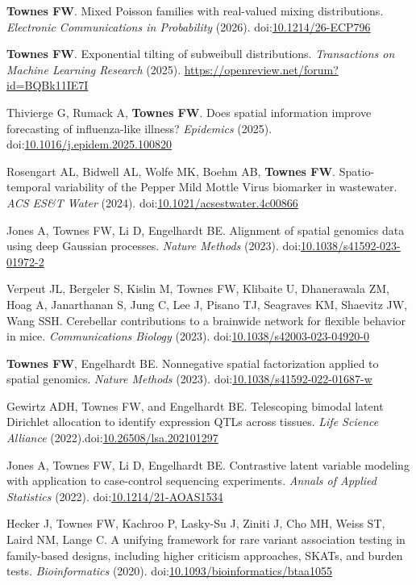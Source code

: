 \documentclass[10pt]{article}
\newcommand\doilink[1]{\href{https://dx.doi.org/#1}{#1}}
\newcommand\doi[1]{doi:\doilink{#1}}
\begin{document}
\begin{enumerate}[label= {[\arabic*]}]
\item {\bf Townes FW}. Mixed Poisson families with real-valued mixing distributions.\\ {\it Electronic Communications in Probability} (2026). \doi{10.1214/26-ECP796}
\item {\bf Townes FW}. Exponential tilting of subweibull distributions. {\it Transactions on Machine Learning Research} (2025). \url{https://openreview.net/forum?id=BQBk11IE7I}
\item Thivierge G, Rumack A, {\bf Townes FW}. Does spatial information improve forecasting of influenza-like illness? {\it Epidemics} (2025). \doi{10.1016/j.epidem.2025.100820}
\item Rosengart AL, Bidwell AL, Wolfe MK, Boehm AB, {\bf Townes FW}. Spatio-temporal variability of the Pepper Mild Mottle Virus biomarker in wastewater. {\it ACS ES\&T Water} (2024). \doi{10.1021/acsestwater.4c00866}
\item Jones A, Townes FW, Li D, Engelhardt BE. Alignment of spatial genomics data using deep Gaussian processes. {\it Nature Methods} (2023). \doi{10.1038/s41592-023-01972-2}
\item Verpeut JL, Bergeler S, Kislin M, Townes FW, Klibaite U, Dhanerawala ZM, Hoag A, Janarthanan S, Jung C, Lee J, Pisano TJ, Seagraves KM, Shaevitz JW, Wang SSH. Cerebellar contributions to a brainwide network for flexible behavior in mice. {\it Communications Biology} (2023). \doi{10.1038/s42003-023-04920-0}
\item {\bf Townes FW}, Engelhardt BE. Nonnegative spatial factorization applied to spatial genomics. {\it Nature Methods} (2023). \doi{10.1038/s41592-022-01687-w}
\item Gewirtz ADH, Townes FW, and Engelhardt BE. Telescoping bimodal latent Dirichlet allocation to identify expression QTLs across tissues. {\it Life Science Alliance} (2022).\newline \doi{10.26508/lsa.202101297}
\item Jones A, Townes FW, Li D, Engelhardt BE. Contrastive latent variable modeling with application to case-control sequencing experiments. {\it Annals of Applied Statistics} (2022). \newline \doi{10.1214/21-AOAS1534}
\item Hecker J, Townes FW, Kachroo P, Lasky-Su J, Ziniti J, Cho MH, Weiss ST, Laird NM, Lange C. A unifying framework for rare variant association testing in family-based designs, including higher criticism approaches, SKATs, and burden tests. {\it Bioinformatics} (2020). \newline \doi{10.1093/bioinformatics/btaa1055}

\end{enumerate}
\end{document}
